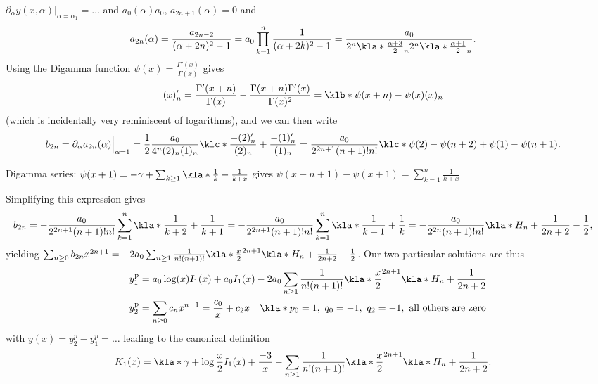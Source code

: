 \documentclass[english, parskip=full]{scrbook}
\newcommand{\note}[1]{\begin{tcolorbox}[colback=colorbackgroundnote,colframe=colornote, breakable,enhanced]#1\end{tcolorbox}}
\newcommand{\example}[3]{\begin{tcolorbox}[colback=colorbackgroundexample,colframe=colorexample, breakable,enhanced,title={\textbf{#1}: #2.}]#3\end{tcolorbox}}
\newcommand{\p}{\text{p}}
\begin{document}
\example{Modified Bessel function}{order $\nu=1$}{$\partial_\alpha y(x,\alpha)\big\vert_{\alpha=\alpha_1} = \dots$ and $a_0(\alpha)a_0$, $a_{2n+1}(\alpha)=0$ and
\begin{align}
a_{2n}(\alpha) &= \frac{a_{2n-2}}{(\alpha+2n)^2-1} = a_0 \prod_{k=1}^n \frac{1}{(\alpha+2k)^2-1} = \frac{a_0}{2^n \kla*{\frac{\alpha+3}{2}}_n 2^n \kla*{\frac{\alpha+1}{2}}_n}.
\end{align} 
Using the Digamma function $\psi(x) = \frac{\Gamma'(x)}{\Gamma(x)}$ gives 
\begin{align}
(x)_n' &= \frac{\Gamma'(x+n)}{\Gamma(x)} - \frac{\Gamma(x+n)\Gamma'(x)}{\Gamma(x)^2} = \klb*{\psi(x+n) - \psi(x)} (x)_n
\end{align}
(which is incidentally very reminiscent of logarithms), and we can then write
\begin{align}
b_{2n} &= \partial_\alpha a_{2n}(\alpha)\Big\vert_{\alpha=1} = \frac{1}{2} \frac{a_0}{4^n (2)_n (1)_n} \klc*{\frac{-(2)_n'}{(2)_n} + \frac{-(1)_n'}{(1)_n}} = \frac{a_0}{2^{2n+1} (n+1)!n!} \klc*{\psi(2) - \psi(n+2) + \psi(1) - \psi(n+1)}.
\end{align}
\note{Digamma series: $\psi(x+1) = -\gamma + \sum_{k\ge 1} \kla*{\frac{1}{k} - \frac{1}{k+x}}$ gives $\psi(x+n+1)-\psi(x+1) = \sum_{k=1}^n\frac{1}{k+x}$}
Simplifying this expression gives
\begin{align}
b_{2n} &= -\frac{a_0}{2^{2n+1} (n+1)!n!} \sum_{k=1}^n\kla*{\frac{1}{k+2} + \frac{1}{k+1}} = -\frac{a_0}{2^{2n+1} (n+1)!n!} \sum_{k=1}^n\kla*{\frac{1}{k+1} + \frac{1}{k}} = -\frac{a_0}{2^{2n} (n+1)!n!} \kla*{H_n + \frac{1}{2n+2} - \frac{1}{2}},
\end{align}
yielding $\sum_{n\ge 0} b_{2n}x^{2n+1} = -2a_0 \sum_{n\ge 1}  \frac{1}{n!(n+1)!} \kla*{\frac{x}{2}}^{2n+1} \kla*{H_n + \frac{1}{2n+2}-\frac{1}{2}}$.
Our two particular solutions are thus
\begin{align}
y_1^\p &= a_0\log(x) I_1(x) + a_0 I_1(x) - 2a_0 \sum_{n\ge 1} \frac{1}{n!(n+1)!} \kla*{\frac{x}{2}}^{2n+1} \kla*{H_n + \frac{1}{2n+2}}\\
y_2^\p &= \sum_{n\ge 0} c_n x^{n-1} = \frac{c_0}{x} + c_2x \quad \kla*{p_0=1,\ q_0=-1,\ q_2=-1,\ \text{all others are zero}}
\end{align}
with $y(x) = y_2^p-y_1^p = \dots$ leading to the canonical definition
\begin{align}
K_1(x) &= \kla*{\gamma + \log \frac{x}{2}} I_1(x) + \frac{-3}{x} - \sum_{n\ge 1} \frac{1}{n!(n+1)!} \kla*{\frac{x}{2}}^{2n+1} \kla*{H_n + \frac{1}{2n+2}}.
\end{align}
}
\end{document}
